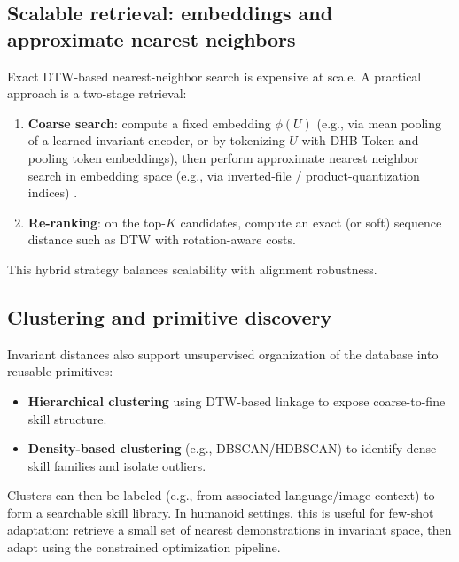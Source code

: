 \documentclass[11pt]{article}
\begin{document}
\subsection{Scalable retrieval: embeddings and approximate nearest neighbors}
Exact DTW-based nearest-neighbor search is expensive at scale. A practical approach is a two-stage retrieval:
\begin{enumerate}
  \item \textbf{Coarse search}: compute a fixed embedding $\phi(U)$ (e.g., via mean pooling of a learned invariant encoder, or by tokenizing $U$ with DHB-Token and pooling token embeddings), then perform approximate nearest neighbor search in embedding space (e.g., via inverted-file / product-quantization indices) \cite{johnson2019faiss}.
  \item \textbf{Re-ranking}: on the top-$K$ candidates, compute an exact (or soft) sequence distance such as DTW with rotation-aware costs.
\end{enumerate}
This hybrid strategy balances scalability with alignment robustness.

\subsection{Clustering and primitive discovery}
Invariant distances also support unsupervised organization of the database into reusable primitives:
\begin{itemize}
  \item \textbf{Hierarchical clustering} using DTW-based linkage to expose coarse-to-fine skill structure.
  \item \textbf{Density-based clustering} (e.g., DBSCAN/HDBSCAN) to identify dense skill families and isolate outliers.
\end{itemize}
Clusters can then be labeled (e.g., from associated language/image context) to form a searchable skill library. In humanoid settings, this is useful for few-shot adaptation: retrieve a small set of nearest demonstrations in invariant space, then adapt using the constrained optimization pipeline.
\end{document}
